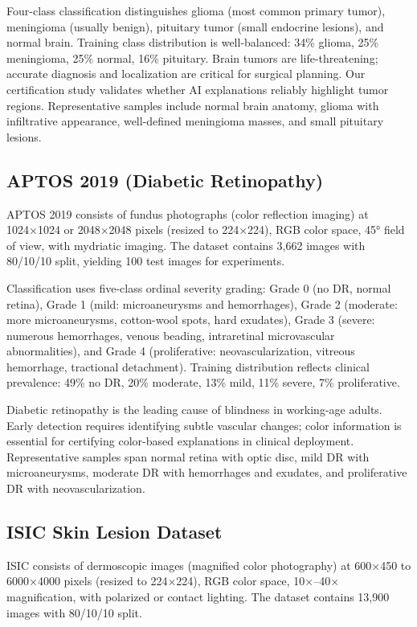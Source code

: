 \documentclass[11pt]{article}
\begin{document}
Four-class classification distinguishes glioma (most common primary tumor), meningioma (usually benign), pituitary tumor (small endocrine lesions), and normal brain. Training class distribution is well-balanced: 34\% glioma, 25\% meningioma, 25\% normal, 16\% pituitary. Brain tumors are life-threatening; accurate diagnosis and localization are critical for surgical planning. Our certification study validates whether AI explanations reliably highlight tumor regions. Representative samples include normal brain anatomy, glioma with infiltrative appearance, well-defined meningioma masses, and small pituitary lesions.

\subsection{APTOS 2019 (Diabetic Retinopathy)}

APTOS 2019 consists of fundus photographs (color reflection imaging) at 1024×1024 or 2048×2048 pixels (resized to 224×224), RGB color space, 45° field of view, with mydriatic imaging. The dataset contains 3,662 images with 80/10/10 split, yielding 100 test images for experiments.

Classification uses five-class ordinal severity grading: Grade 0 (no DR, normal retina), Grade 1 (mild: microaneurysms and hemorrhages), Grade 2 (moderate: more microaneurysms, cotton-wool spots, hard exudates), Grade 3 (severe: numerous hemorrhages, venous beading, intraretinal microvascular abnormalities), and Grade 4 (proliferative: neovascularization, vitreous hemorrhage, tractional detachment). Training distribution reflects clinical prevalence: 49\% no DR, 20\% moderate, 13\% mild, 11\% severe, 7\% proliferative.

Diabetic retinopathy is the leading cause of blindness in working-age adults. Early detection requires identifying subtle vascular changes; color information is essential for certifying color-based explanations in clinical deployment. Representative samples span normal retina with optic disc, mild DR with microaneurysms, moderate DR with hemorrhages and exudates, and proliferative DR with neovascularization.

\subsection{ISIC Skin Lesion Dataset}

ISIC consists of dermoscopic images (magnified color photography) at 600×450 to 6000×4000 pixels (resized to 224×224), RGB color space, 10×–40× magnification, with polarized or contact lighting. The dataset contains 13,900 images with 80/10/10 split.
\end{document}
